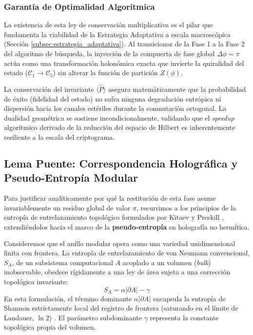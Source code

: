 \documentclass[12pt,a4paper]{article}
\theoremstyle{plain}
\theoremstyle{definition}
\theoremstyle{remark}
\begin{document}
\subsubsection*{Garantía de Optimalidad Algorítmica}

La existencia de esta ley de conservación multiplicativa es el pilar que fundamenta la viabilidad de la Estrategia Adaptativa a escala macroscópica (Sección \ref{subsec:estrategia_adaptativa}). Al transicionar de la Fase 1 a la Fase 2 del algoritmo de búsqueda, la inyección de la compuerta de fase global $\Delta\phi = \pi$ actúa como una transformación holonómica exacta que invierte la quiralidad del estado ($\mathcal{C}_1 \to \mathcal{C}_5$) sin alterar la función de partición $Z(\phi)$. 

La conservación del invariante $\langle \hat{P} \rangle$ asegura matemáticamente que la probabilidad de éxito (fidelidad del estado) no sufra ninguna degradación entrópica ni dispersión hacia los canales estériles durante la conmutación ortogonal. La dualidad geométrica se sostiene incondicionalmente, validando que el \textit{speedup} algorítmico derivado de la reducción del espacio de Hilbert es inherentemente resiliente a la escala del criptograma.

\subsection{Lema Puente: Correspondencia Holográfica y Pseudo-Entropía Modular}
\label{subsec:lema_puente}

Para justificar analíticamente por qué la restitución de esta fase asume invariablemente un residuo global de valor $\pi$, recurrimos a los principios de la entropía de entrelazamiento topológico formulados por Kitaev y Preskill \cite{Kitaev2006}, extendiéndolos hacia el marco de la \textbf{pseudo-entropía} en holografía no hermítica.

Consideremos que el anillo modular opera como una variedad unidimensional finita con frontera. La entropía de entrelazamiento de von Neumann convencional, $S_A$, de un subsistema computacional $A$ acoplado a un volumen (\textit{bulk}) inobservable, obedece rígidamente a una ley de área sujeta a una corrección topológica invariante:
\begin{equation}
    S_A = \alpha |\partial A| - \gamma
\end{equation}
En esta formulación, el término dominante $\alpha |\partial A|$ encapsula la entropía de Shannon estrictamente local del registro de frontera (saturando en el límite de Landauer, $\ln 2$) \cite{Landauer1961}. El parámetro subdominante $\gamma$ representa la constante topológica propia del volumen.
\end{document}

